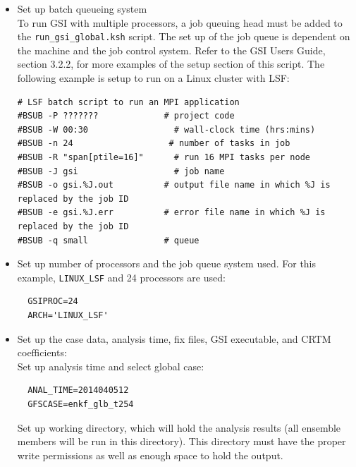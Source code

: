 \begin{itemize}
\item Set up batch queueing system \\
To run GSI with multiple processors, a job queuing head must be added to the \verb|run_gsi_global.ksh| script. The set up of the job queue is dependent on the machine and the job control system. Refer to the GSI User\textquotesingle s Guide, section 3.2.2, for more examples of the setup section of this script. The following example is setup to run on a Linux cluster with LSF:

\begin{footnotesize}
\begin{verbatim}
# LSF batch script to run an MPI application
#BSUB -P ???????             # project code
#BSUB -W 00:30                 # wall-clock time (hrs:mins)
#BSUB -n 24                   # number of tasks in job         
#BSUB -R "span[ptile=16]"      # run 16 MPI tasks per node
#BSUB -J gsi                   # job name
#BSUB -o gsi.%J.out          # output file name in which %J is replaced by the job ID
#BSUB -e gsi.%J.err          # error file name in which %J is replaced by the job ID
#BSUB -q small               # queue
\end{verbatim}
\end{footnotesize}

\item Set up number of processors and the job queue system used. For this example, \verb|LINUX_LSF| and 24 processors are used:

\begin{footnotesize}
\begin{verbatim}
  GSIPROC=24
  ARCH='LINUX_LSF'
\end{verbatim}
\end{footnotesize}

\item Set up the case data, analysis time, fix files, GSI executable, and CRTM coefficients:  \\

Set up analysis time and select global case:

\begin{footnotesize}
\begin{verbatim}
  ANAL_TIME=2014040512
  GFSCASE=enkf_glb_t254
\end{verbatim}
\end{footnotesize}

Set up working directory, which will hold the analysis results (all ensemble members will be run in this directory). This directory must have the proper write permissions as well as enough space to hold the output.


\end{itemize}
